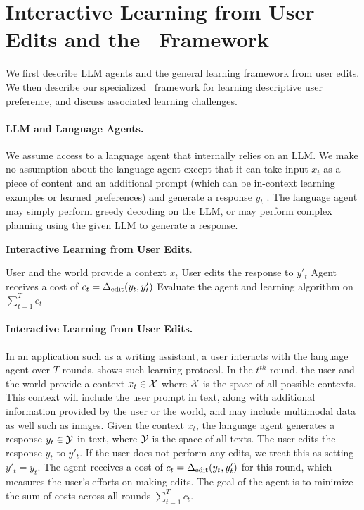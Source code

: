 \section{Interactive Learning from User Edits and the \framework~Framework}

We first describe LLM agents and the general learning framework from user edits. We then describe our specialized \framework~framework for learning descriptive user preference, and discuss associated learning challenges. 

\paragraph{LLM and Language Agents.} We assume access to a language agent that internally relies on an LLM. We make no assumption about the language agent except that it can take  input $x_t$ as a piece of content and an additional prompt (which can be in-context learning examples or learned preferences) and generate a response $y_t$ . The language agent may simply perform greedy decoding on the LLM, or may perform complex planning using the given LLM to generate a response.

\begin{protocol}
\caption{\textbf{Interactive Learning from User Edits}.}
\label{proto:learning_from_edits}
    \begin{algorithmic}[1]
        \State User and the world provide a context $x_t$
        \State {}
        \State User edits the response to $y'_t$
        \State Agent receives a cost of $c_t = \Delta_{\textrm{edit}}(y_t, y'_t)$
        \EndFor
        \State Evaluate the agent and learning algorithm on $\sum_{t=1}^T c_t$
    \end{algorithmic}
\end{protocol}

\paragraph{Interactive Learning from User Edits.} In an application such as a writing assistant, a user interacts with the language agent over $T$ rounds.  shows such learning protocol. In the $t^{th}$ round, the user and the world provide a context $x_t \in \mathcal{X}$ where $\mathcal{X}$ is the space of all possible contexts. This context will include the user prompt in text, along with additional information provided by the user or the world, and may include multimodal data as well such as images. Given the context $x_t$, the language agent generates a response $y_t \in \mathcal{Y}$ in text, where $\mathcal{Y}$ is the space of all texts. The user edits the response $y_t$ to $y'_t$. If the user does not perform any edits, we treat this as setting $y'_t=y_t$. The agent receives a cost of $c_t = \Delta_{\textrm{edit}}(y_t, y'_t)$ for this round, which measures the user's efforts on making edits. The goal of the agent is to minimize the sum of costs across all rounds $\sum_{t=1}^T c_t$. 

